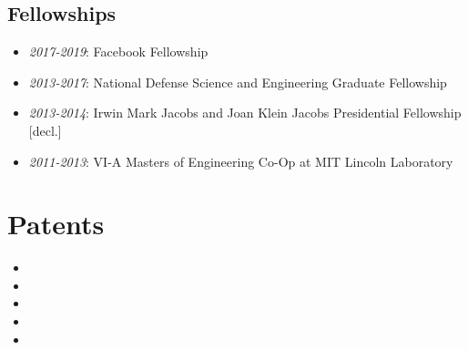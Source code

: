 \documentclass[letterpaper,12pt]{article}
\begin{document}
\subsection{Fellowships}
\begin{itemize}
\item \emph{2017-2019}: Facebook Fellowship
\item \emph{2013-2017}: National Defense Science and Engineering Graduate Fellowship
\item \emph{2013-2014}: Irwin Mark Jacobs and Joan Klein Jacobs Presidential Fellowship [decl.]
\item \emph{2011-2013}: VI-A Masters of Engineering Co-Op at MIT Lincoln Laboratory 
\end{itemize}





\section{Patents}

\begin{itemize}
\item {}
\item {}
\item {}
\item {}
\item {}
\end{itemize}
\end{document}
